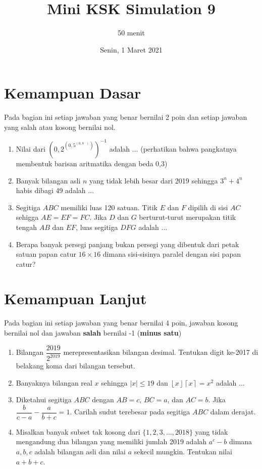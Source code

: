 \documentclass{article}
\title{Mini KSK Simulation 9 }
\author{50 menit}
\date{Senin, 1 Maret 2021}
\begin{document}
	\maketitle
	
	\section{Kemampuan Dasar}
	Pada bagian ini setiap jawaban yang benar bernilai 2 poin dan setiap jawaban yang salah
	atau kosong bernilai nol.
	\begin{enumerate}
		\item Nilai dari $\left(0,2 ^{\left(0,5 ^{\left(0,8 ^{...} \right)} \right)} \right)^{-1}$ adalah $\dots$ (perhatikan bahwa pangkatnya membentuk barisan aritmatika dengan beda 0,3)
		
		\item Banyak bilangan asli $n$ yang tidak lebih besar dari 2019 sehingga $3^n+4^n$ habis dibagi 49 adalah $\dots$
		
		
		
		\item Segitiga $ABC$ memiliki luas 120 satuan. Titik $E$ dan $F$ dipilih di sisi $AC$ sehigga $AE=EF=FC$. Jika $D$ dan $G$ berturut-turut merupakan titik tengah $AB$ dan $EF$, luas segitiga $DFG$ adalah $\dots$
		
		\item
		Berapa banyak persegi panjang bukan persegi yang dibentuk dari petak satuan papan catur $16 \times 16$ dimana sisi-sisinya paralel dengan sisi papan catur?
		
	\end{enumerate}

\section{Kemampuan Lanjut}
Pada bagian ini setiap jawaban yang benar bernilai 4 poin, jawaban kosong bernilai nol
dan jawaban \textbf{salah} bernilai -1 (\textbf{minus satu})

\begin{enumerate}[resume]
	\item Bilangan $\dfrac{2019}{2^{2019}}$ merepresentasikan bilangan desimal. Tentukan digit ke-2017 di belakang koma dari bilangan tersebut.
	
	\item Banyaknya bilangan real $x$ sehingga $|x| \le 19$ dan $\left \lfloor x \right \rfloor\left \lceil x \right \rceil = x^2$ adalah $\dots$
	
	\item Diketahui segitiga $ABC$ dengan $AB=c$, $BC=a$, dan $AC=b$. Jika $\dfrac{b}{c-a} - \dfrac{a}{b+c} = 1$. Carilah sudut terebesar pada segitiga $ABC$ dalam derajat.
	
	\item
	Misalkan banyak subset tak kosong dari $\{1,2,3,\dots,2018\}$ yang tidak mengandung dua bilangan yang memiliki jumlah 2019 adalah $a^c-b$ dimana $a,b,c$ adalah bilangan asli dan nilai $a$ sekecil mungkin. Tentukan nilai $a+b+c$.
	
	
\end{enumerate}
\end{document}
